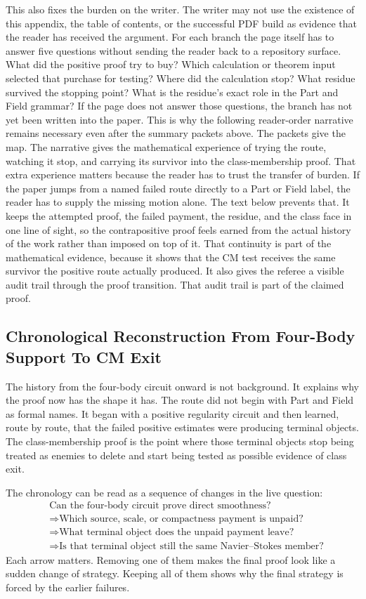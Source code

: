 This also fixes the burden on the writer.
The writer may not use the existence of this appendix, the table of contents,
or the successful PDF build as evidence that the reader has received the
argument.
For each branch the page itself has to answer five questions without sending
the reader back to a repository surface.
What did the positive proof try to buy?
Which calculation or theorem input selected that purchase for testing?
Where did the calculation stop?
What residue survived the stopping point?
What is the residue's exact role in the Part and Field grammar?
If the page does not answer those questions, the branch has not yet been
written into the paper.
This is why the following reader-order narrative remains necessary even after
the summary packets above.
The packets give the map.
The narrative gives the mathematical experience of trying the route, watching
it stop, and carrying its survivor into the class-membership proof.
That extra experience matters because the reader has to trust the transfer of
burden.
If the paper jumps from a named failed route directly to a Part or Field
label, the reader has to supply the missing motion alone.
The text below prevents that.
It keeps the attempted proof, the failed payment, the residue, and the class
face in one line of sight, so the contrapositive proof feels earned from the
actual history of the work rather than imposed on top of it.
That continuity is part of the mathematical evidence, because it shows that the
CM test receives the same survivor the positive route actually produced.
It also gives the referee a visible audit trail through the proof transition.
That audit trail is part of the claimed proof.

\subsection{Chronological Reconstruction From Four-Body Support To CM Exit}

The history from the four-body circuit onward is not background.
It explains why the proof now has the shape it has.
The route did not begin with Part and Field as formal names.
It began with a positive regularity circuit and then learned, route by route,
that the failed positive estimates were producing terminal objects.
The class-membership proof is the point where those terminal objects stop being
treated as enemies to delete and start being tested as possible evidence of
class exit.

The chronology can be read as a sequence of changes in the live question:
\[
  \begin{aligned}
  &\text{Can the four-body circuit prove direct smoothness?}\\
  &\Longrightarrow
  \text{Which source, scale, or compactness payment is unpaid?}\\
  &\Longrightarrow
  \text{What terminal object does the unpaid payment leave?}\\
  &\Longrightarrow
  \text{Is that terminal object still the same Navier--Stokes member?}
  \end{aligned}
\]
Each arrow matters.
Removing one of them makes the final proof look like a sudden change of
strategy.
Keeping all of them shows why the final strategy is forced by the earlier
failures.

